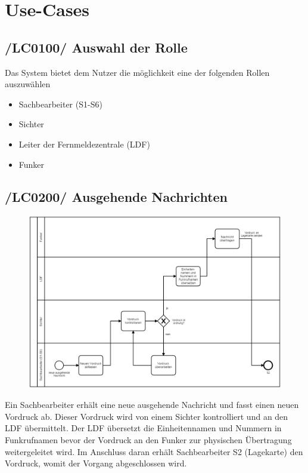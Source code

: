 \section{Use-Cases}

\subsection{/LC0100/ Auswahl der Rolle}
Das System bietet dem Nutzer die möglichkeit eine der folgenden Rollen auszuwählen
\begin{itemize}
\item Sachbearbeiter (S1-S6)
\item Sichter
\item Leiter der Fernmeldezentrale (LDF)
\item Funker
\end{itemize}

\newpage
\subsection{/LC0200/ Ausgehende Nachrichten}
\begin{figure}[htpb]
	\centering
	\includegraphics[width=0.95\linewidth]{ausgehend.png}
\end{figure} Ein Sachbearbeiter erhält eine neue ausgehende Nachricht und fasst einen neuen Vordruck ab. Dieser Vordruck wird von einem Sichter kontrolliert und an den LDF übermittelt. Der LDF übersetzt die Einheitennamen und Nummern in Funkrufnamen bevor der Vordruck an den Funker zur physischen Übertragung weitergeleitet wird. Im Anschluss daran erhält Sachbearbeiter S2 (Lagekarte) den Vordruck, womit der Vorgang abgeschlossen wird.

\newpage
